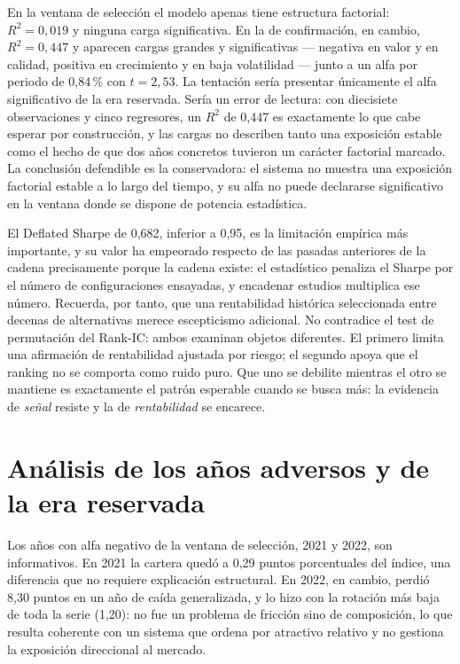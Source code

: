 En la ventana de selección el modelo apenas tiene estructura factorial: $R^2=0,019$ y ninguna carga
significativa. En la de confirmación, en cambio, $R^2=0,447$ y aparecen cargas grandes y
significativas --- negativa en valor y en calidad, positiva en crecimiento y en baja volatilidad ---
junto a un alfa por periodo de 0,84\,\% con $t=2,53$. La tentación sería presentar únicamente el
alfa significativo de la era reservada. Sería un error de lectura: con diecisiete observaciones y
cinco regresores, un $R^2$ de 0,447 es exactamente lo que cabe esperar por construcción, y las
cargas no describen tanto una exposición estable como el hecho de que dos años concretos tuvieron
un carácter factorial marcado. La conclusión defendible es la conservadora: el sistema no muestra
una exposición factorial estable a lo largo del tiempo, y su alfa no puede declararse
significativo en la ventana donde se dispone de potencia estadística.

El Deflated Sharpe de 0,682, inferior a 0,95, es la limitación empírica más importante, y su valor
ha empeorado respecto de las pasadas anteriores de la cadena precisamente porque la cadena existe:
el estadístico penaliza el Sharpe por el número de configuraciones ensayadas, y encadenar estudios
multiplica ese número. Recuerda, por tanto, que una rentabilidad histórica seleccionada entre
decenas de alternativas merece escepticismo adicional. No contradice el test de permutación del
Rank-IC: ambos examinan objetos diferentes. El primero limita una afirmación de rentabilidad
ajustada por riesgo; el segundo apoya que el ranking no se comporta como ruido puro. Que uno se
debilite mientras el otro se mantiene es exactamente el patrón esperable cuando se busca más: la
evidencia de \emph{señal} resiste y la de \emph{rentabilidad} se encarece.

\section{Análisis de los años adversos y de la era reservada}

Los años con alfa negativo de la ventana de selección, 2021 y 2022, son informativos. En 2021 la
cartera quedó a 0,29 puntos porcentuales del índice, una diferencia que no requiere explicación
estructural. En 2022, en cambio, perdió 8,30 puntos en un año de caída generalizada, y lo hizo con
la rotación más baja de toda la serie (1,20): no fue un problema de fricción sino de composición,
lo que resulta coherente con un sistema que ordena por atractivo relativo y no gestiona la
exposición direccional al mercado.

